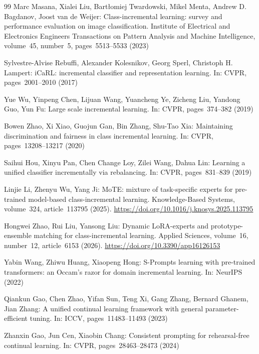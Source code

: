 \documentclass[runningheads]{llncs}
\begin{document}
\begin{thebibliography}{99}
Marc Masana, Xialei Liu, Bartłomiej Twardowski, Mikel Menta,
Andrew D. Bagdanov, Joost van de Weijer: Class-incremental learning: survey and
performance evaluation on image classification. Institute of Electrical and
Electronics Engineers Transactions on Pattern Analysis and Machine Intelligence,
volume~45, number~5, pages~5513--5533 (2023)

Sylvestre-Alvise Rebuffi, Alexander Kolesnikov, Georg Sperl,
Christoph H. Lampert: iCaRL: incremental classifier and representation learning.
In: CVPR, pages~2001--2010 (2017)

Yue Wu, Yinpeng Chen, Lijuan Wang, Yuancheng Ye, Zicheng Liu, Yandong Guo,
Yun Fu: Large scale incremental learning. In: CVPR, pages~374--382 (2019)

Bowen Zhao, Xi Xiao, Guojun Gan, Bin Zhang, Shu-Tao Xia: Maintaining
discrimination and fairness in class incremental learning. In: CVPR,
pages~13208--13217 (2020)

Saihui Hou, Xinyu Pan, Chen Change Loy, Zilei Wang, Dahua Lin: Learning a unified
classifier incrementally via rebalancing. In: CVPR, pages~831--839 (2019)

Linjie Li, Zhenyu Wu, Yang Ji: MoTE: mixture of task-specific experts for pre-trained
model-based class-incremental learning. Knowledge-Based Systems, volume~324,
article~113795 (2025). \url{https://doi.org/10.1016/j.knosys.2025.113795}

Hongwei Zhao, Rui Liu, Yansong Liu: Dynamic LoRA-experts and prototype-ensemble matching
for class-incremental learning. Applied Sciences, volume~16, number~12,
article~6153 (2026).
\url{https://doi.org/10.3390/app16126153}


Yabin Wang, Zhiwu Huang, Xiaopeng Hong: S-Prompts learning with pre-trained transformers:
an Occam's razor for domain incremental learning. In: NeurIPS (2022)

Qiankun Gao, Chen Zhao, Yifan Sun, Teng Xi, Gang Zhang, Bernard Ghanem,
Jian Zhang: A unified
continual learning framework with general parameter-efficient tuning. In: ICCV,
pages~11483--11493 (2023)

Zhanxin Gao, Jun Cen, Xiaobin Chang: Consistent prompting for rehearsal-free
continual learning. In: CVPR, pages~28463--28473 (2024)


\end{thebibliography}
\end{document}
